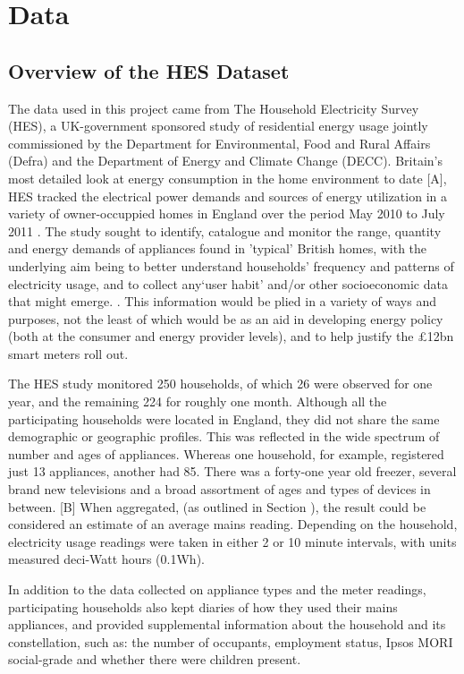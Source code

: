 \chapter{Data}


\section{Overview of the HES Dataset}
The data used in this project came from The Household Electricity Survey (HES), a UK-government sponsored study of residential energy usage jointly commissioned by the Department for Environmental, Food and Rural Affairs (Defra) and the Department of Energy and Climate Change (DECC).  Britain's most detailed look at energy consumption in the home environment to date [A], HES tracked the electrical power demands and sources of energy utilization in a variety of owner-occuppied homes in England over the period May 2010 to July 2011 \cite{HES}. The study sought to identify, catalogue and monitor the range, quantity and energy demands of appliances found in 'typical' British homes, with the underlying aim being to better understand households' frequency and patterns of electricity usage, and to collect any`user habit' and/or other socioeconomic data that might emerge. \cite{early_findings}.  This information would be plied in a variety of ways and purposes, not the least of which would be as an aid in developing energy policy  (both at the consumer and energy provider levels), and to help justify the £12bn smart meters roll out.   

The HES study monitored 250 households, of which 26 were observed for one year, and the remaining 224 for roughly one month. Although all the participating households were located in England, they did not share the same demographic or geographic profiles.   This was reflected in the wide spectrum of number and ages of appliances.  Whereas one household, for example, registered just 13 appliances, another had 85.  There was a forty-one year old freezer, several brand new televisions and a broad assortment of ages and types of devices in between. [B]  When aggregated, (as outlined in Section \aggregationSection), the result could be considered an estimate of an average mains reading. Depending on the household, electricity usage readings were taken in  either 2 or 10 minute intervals, with units measured deci-Watt hours (0.1Wh). 

In addition to the data collected on appliance types and the meter readings, participating households also kept diaries of how they used their mains appliances, and provided supplemental information about the household and its constellation, such as: the number of occupants, employment status, Ipsos MORI social-grade and whether there were children present.


